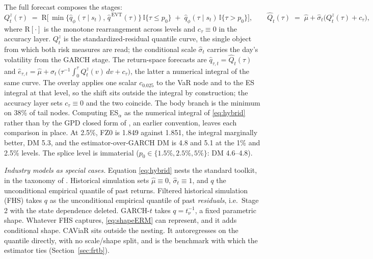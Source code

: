 \documentclass[11pt]{article}
\theoremstyle{remark}
\begin{document}
The full forecast composes the stages:
\begin{equation}
Q^{z}_t(\tau) \;=\;
\mathrm{R}\Big[\, \min\{\widehat{q}_\phi(\tau \mid s_t),\,
\widehat{q}^{\,\mathrm{EVT}}(\tau)\}\,\mathbb{I}\{\tau \le p_0\}
\;+\; \widehat{q}_\phi(\tau \mid s_t)\,\mathbb{I}\{\tau > p_0\}
\Big],\qquad
\widehat{Q}_t(\tau) \;=\; \widehat{\mu} + \widehat{\sigma}_t \big(Q^{z}_t(\tau) + c_\tau\big),
\label{eq:hybrid}
\end{equation}
where $\mathrm{R}[\cdot]$ is the monotone rearrangement across
levels \citep{cherno2010rearr} and $c_\tau\equiv0$ in the accuracy layer. $Q^{z}_t$ is the standardized-residual quantile curve, the single object from which both risk measures are read; the conditional scale $\widehat{\sigma}_t$ carries the day's volatility from the GARCH stage. The return-space forecasts are $\widehat{q}_{\tau,t}=\widehat{Q}_t(\tau)$
and $\widehat{e}_{\tau,t}=\widehat{\mu}+\widehat{\sigma}_t\,\big(\tau^{-1}\!\int_0^\tau Q^{z}_t(v)\,dv + c_\tau\big)$, the latter a numerical integral of the same curve. The overlay applies one scalar $c_{0.025}$ to the VaR node and to the ES integral at that level, so the shift sits outside the integral by construction; the accuracy layer sets $c_\tau\equiv0$ and the two coincide.
The body branch is the minimum on 38\% of tail nodes. Computing ES$_\alpha$ as the numerical integral of \eqref{eq:hybrid} rather than by the GPD closed form of \citet{mcneilfrey2000}, an earlier convention, leaves each comparison in place. At 2.5\%, FZ0 is 1.849 against 1.851, the integral marginally better, DM 5.3, and the estimator-over-GARCH DM is 4.8 and 5.1 at the 1\% and 2.5\% levels. The splice level is immaterial ($p_0\in\{1.5\%,2.5\%,5\%\}$: DM 4.6--4.8).

\noindent\emph{Industry models as special cases.} Equation \eqref{eq:hybrid} nests the standard toolkit, in the taxonomy of \citet{kuester2006}. Historical simulation sets $\widehat{\mu}\equiv 0$, $\widehat{\sigma}_t \equiv 1$, and $q$ the unconditional empirical quantile of past returns. Filtered historical simulation (FHS) \citep{baroneadesi1999fhs, hullwhite1998} takes $q$ as the unconditional empirical quantile of past \emph{residuals}, i.e.\ Stage 2 with the state dependence deleted. GARCH-$t$ \citep{bollerslev1987} takes $q = t_\nu^{-1}$, a fixed parametric shape. Whatever FHS captures, \eqref{eq:shapeERM} can represent, and it adds conditional shape. CAViaR \citep{engle2004caviar} sits outside the nesting. It autoregresses on the quantile directly, with no scale/shape split, and is the benchmark with which the estimator ties (Section~\ref{sec:frtb}).
\end{document}
